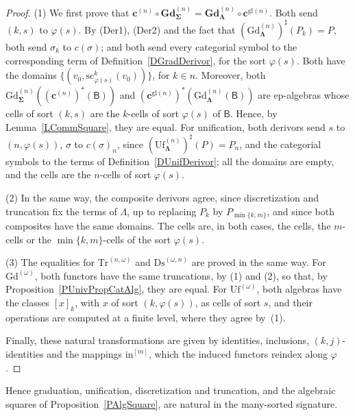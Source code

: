 \documentclass[a4paper,reqno]{amsart}
\newcommand{\sig}[1]{\mathbf{#1}}                %
\newcommand{\calg}[1]{\boldsymbol{\mathsf{#1}}}  %
\newcommand{\gl}{\mathrm{gl}}
\newcommand{\src}{\mathrm{sc}}
\newcommand{\Gd}{\mathrm{Gd}}
\newcommand{\Uf}{\mathrm{Uf}}
\newcommand{\Ds}{\mathrm{Ds}}
\newcommand{\Tr}{\mathrm{Tr}}
\newcommand{\bGd}{\mathbf{Gd}}
\theoremstyle{plain}
\theoremstyle{definition}
\begin{document}
\begin{proof}
(1) We first prove that $\mathbf{c}^{(n)}\circ\bGd^{(n)}_{\sig{\Sigma}}=\bGd^{(n)}_{\sig{\Lambda}}\circ\mathbf{c}^{\gl(n)}$.
Both send $(k,s)$ to $\varphi(s)$.
By (Der1), (Der2) and the fact that $(\Gd^{(n)}_{\sig{\Lambda}})^{\sharp}(P_{k})=P$, both send $\sigma_{k}$ to $c(\sigma)$; and both send every categorial symbol to the corresponding term of Definition~\ref{DGradDerivor}, for the sort $\varphi(s)$.
Both have the domains $\{(v_{0},\src^{k}_{\varphi(s)}(v_{0}))\}$, for $k\in n$.
Moreover, both $\Gd^{(n)}_{\sig{\Sigma}}((\mathbf{c}^{(n)})^{\ast}(\calg{B}))$ and $(\mathbf{c}^{\gl(n)})^{\ast}(\Gd^{(n)}_{\sig{\Lambda}}(\calg{B}))$ are ep-algebras whose cells of sort $(k,s)$ are the $k$-cells of sort $\varphi(s)$ of $\calg{B}$.
Hence, by Lemma~\ref{LCommSquare}, they are equal.
For unification, both derivors send $s$ to $(n,\varphi(s))$, $\sigma$ to $c(\sigma)_{n}$, since $(\Uf^{(n)}_{\sig{\Lambda}})^{\sharp}(P)=P_{n}$, and the categorial symbols to the terms of Definition~\ref{DUnifDerivor}; all the domains are empty, and the cells are the $n$-cells of sort $\varphi(s)$.

(2) In the same way, the composite derivors agree, since discretization and truncation fix the terms of $\Lambda$, up to replacing $P_{k}$ by $P_{\min\{k,m\}}$, and since both composites have the same domains.
The cells are, in both cases, the cells, the $m$-cells or the $\min\{k,m\}$-cells of the sort $\varphi(s)$.

(3) The equalities for $\Tr^{(n,\omega)}$ and $\Ds^{(\omega,n)}$ are proved in the same way.
For $\Gd^{(\omega)}$, both functors have the same truncations, by (1) and (2), so that, by Proposition~\ref{PUnivPropCatAlg}, they are equal.
For $\Uf^{(\omega)}$, both algebras have the classes $[x]_{k}$, with $x$ of sort $(k,\varphi(s))$, as cells of sort $s$, and their operations are computed at a finite level, where they agree by~(1).

Finally, these natural transformations are given by identities, inclusions, $(k,j)$-identities and the mappings $\mathrm{in}^{[m]}$, which the induced functors reindex along $\varphi$.
\end{proof}

Hence graduation, unification, discretization and truncation, and the algebraic squares of Proposition~\ref{PAlgSquare}, are natural in the many-sorted signature.



\end{document}
